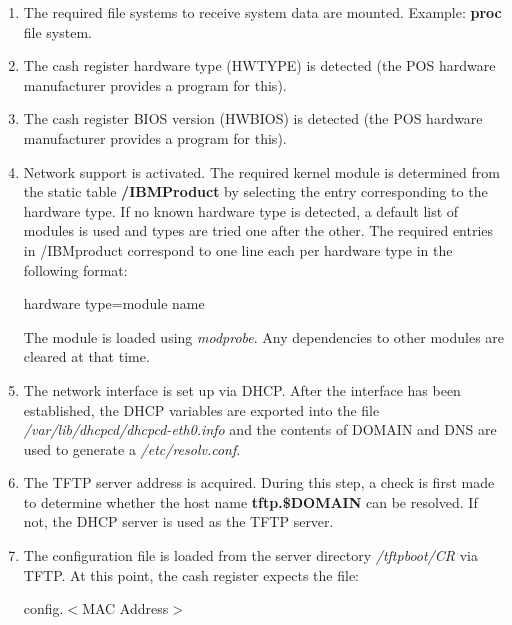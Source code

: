 \begin{enumerate}
      \item The required file systems to receive system data are mounted.
            Example: \textbf{proc} file system.
      \item The cash register hardware type (HWTYPE) is detected (the POS
	    hardware manufacturer provides a
            program for this).
      \item The cash register BIOS version (HWBIOS) is detected (the POS
	    hardware manufacturer provides a
            program for this).
      \item Network support is activated. The required kernel module
            is determined from the static table \textbf{/IBMProduct}
            by selecting the entry corresponding
            to the hardware type. If no known hardware type is detected, a
            default list of modules is used and types are tried one after the
            other. The required entries in /IBMproduct  correspond to one
            line each per hardware type in the following format:

            \begin{Command}{8cm}
            hardware type=module name
            \end{Command}

            The module is loaded using \textit{modprobe}. Any dependencies to
            other modules are cleared at that time.
      \item The network interface is set up via DHCP. After the interface has
            been established, the DHCP variables are exported into the file
            \textit{/var/lib/dhcpcd/dhcpcd-eth0.info} and the contents of
            DOMAIN and DNS are used to generate a \textit{/etc/resolv.conf}.
      \item The TFTP server address is acquired. During this step, a check
            is first made to determine whether the host name
            \textbf{tftp.\$DOMAIN} can be resolved. If not, the DHCP
            server is used as the TFTP server.
      \item The configuration file is loaded from the server directory
            \textit{/tftpboot/CR} via TFTP. At this point, the cash register
            expects the file:

            \begin{Command}{8cm}
            config.$<$MAC Address$>$
            \end{Command}


\end{enumerate}
